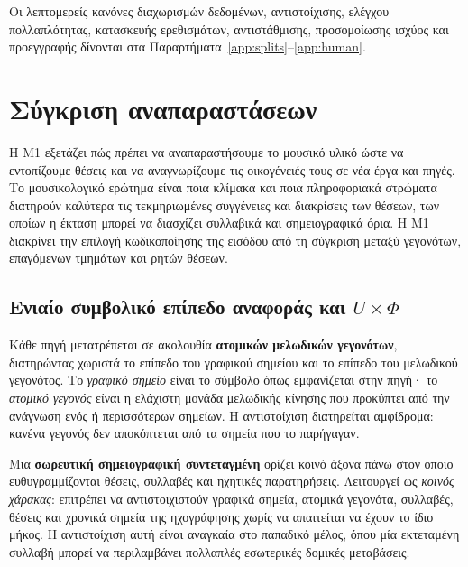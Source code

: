 \documentclass[11pt,a4paper]{article}
\begin{document}
Οι λεπτομερείς κανόνες διαχωρισμών δεδομένων, αντιστοίχισης, ελέγχου πολλαπλότητας, κατασκευής ερεθισμάτων, αντιστάθμισης, προσομοίωσης ισχύος και προεγγραφής δίνονται στα Παραρτήματα~\ref{app:splits}--\ref{app:human}.

\section{Σύγκριση αναπαραστάσεων}\label{sec:m1}

Η M1 εξετάζει πώς πρέπει να αναπαραστήσουμε το μουσικό υλικό ώστε να εντοπίζουμε θέσεις και να αναγνωρίζουμε τις οικογένειές τους σε νέα έργα και πηγές. Το μουσικολογικό ερώτημα είναι ποια κλίμακα και ποια πληροφοριακά στρώματα διατηρούν καλύτερα τις τεκμηριωμένες συγγένειες και διακρίσεις των θέσεων, των οποίων η έκταση μπορεί να διασχίζει συλλαβικά και σημειογραφικά όρια. Η M1 διακρίνει την επιλογή κωδικοποίησης της εισόδου από τη σύγκριση μεταξύ γεγονότων, επαγόμενων τμημάτων και ρητών θέσεων.

\subsection{Ενιαίο συμβολικό επίπεδο αναφοράς και \texorpdfstring{$U\times\Phi$}{U x F}}

Κάθε πηγή μετατρέπεται σε ακολουθία \textbf{ατομικών μελωδικών γεγονότων}, διατηρώντας χωριστά το επίπεδο του γραφικού σημείου και το επίπεδο του μελωδικού γεγονότος. Το \emph{γραφικό σημείο} είναι το σύμβολο όπως εμφανίζεται στην πηγή· το \emph{ατομικό γεγονός} είναι η ελάχιστη μονάδα μελωδικής κίνησης που προκύπτει από την ανάγνωση ενός ή περισσότερων σημείων. Η αντιστοίχιση διατηρείται αμφίδρομα: κανένα γεγονός δεν αποκόπτεται από τα σημεία που το παρήγαγαν.

Μια \textbf{σωρευτική σημειογραφική συντεταγμένη} ορίζει κοινό άξονα πάνω στον οποίο ευθυγραμμίζονται θέσεις, συλλαβές και ηχητικές παρατηρήσεις. Λειτουργεί ως \emph{κοινός χάρακας}: επιτρέπει να αντιστοιχιστούν γραφικά σημεία, ατομικά γεγονότα, συλλαβές, θέσεις και χρονικά σημεία της ηχογράφησης χωρίς να απαιτείται να έχουν το ίδιο μήκος. Η αντιστοίχιση αυτή είναι αναγκαία στο παπαδικό μέλος, όπου μία εκτεταμένη συλλαβή μπορεί να περιλαμβάνει πολλαπλές εσωτερικές δομικές μεταβάσεις.
\end{document}
